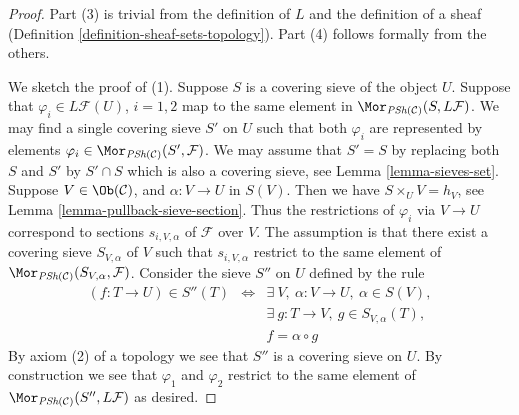 \begin{proof}
Part (3) is trivial from the definition of $L$ and
the definition of a sheaf (Definition \ref{definition-sheaf-sets-topology}).
Part (4) follows formally from the others.

\medskip\noindent
We sketch the proof of (1). Suppose $S$ is a covering sieve
of the object $U$. Suppose that $\varphi_i \in L\mathcal{F}(U)$,
$i = 1, 2$ map to the same element in
$\Mor_{\textit{PSh}(\mathcal{C})}(S, L\mathcal{F})$.
We may find a single covering sieve $S'$ on $U$ such
that both $\varphi_i$ are represented by elements
$\varphi_i \in \Mor_{\textit{PSh}(\mathcal{C})}(S', \mathcal{F})$.
We may assume that $S' = S$ by replacing both $S$ and $S'$ by
$S' \cap S$ which is also a covering sieve, see Lemma \ref{lemma-sieves-set}.
Suppose $V\in \Ob(\mathcal{C})$, and
$\alpha : V \to U$ in $S(V)$.
Then we have $S \times_U V = h_V$,
see Lemma \ref{lemma-pullback-sieve-section}. Thus the restrictions
of $\varphi_i$ via $V \to U$ correspond to sections $s_{i, V, \alpha}$
of $\mathcal{F}$ over $V$. The assumption is that there exist
a covering sieve $S_{V, \alpha}$ of $V$ such that
$s_{i, V, \alpha}$ restrict to the same element of
$\Mor_{\textit{PSh}(\mathcal{C})}(S_{V, \alpha}, \mathcal{F})$.
Consider the sieve $S''$ on $U$ defined by the rule
\begin{eqnarray}
\label{equation-S-prime-prime}
(f : T \to U) \in S''(T)
& \Leftrightarrow &
\exists\ V , \ \alpha : V \to U, \ \alpha \in S(V), \nonumber \\
& &
\exists\ g : T \to V, \ g \in S_{V, \alpha}(T), \\
& &
f = \alpha \circ g \nonumber
\end{eqnarray}
By axiom (2) of a topology we see that $S''$ is a covering
sieve on $U$. By construction we see that $\varphi_1$
and $\varphi_2$ restrict to the same element of
$\Mor_{\textit{PSh}(\mathcal{C})}(S'', L\mathcal{F})$
as desired.


\end{proof}
